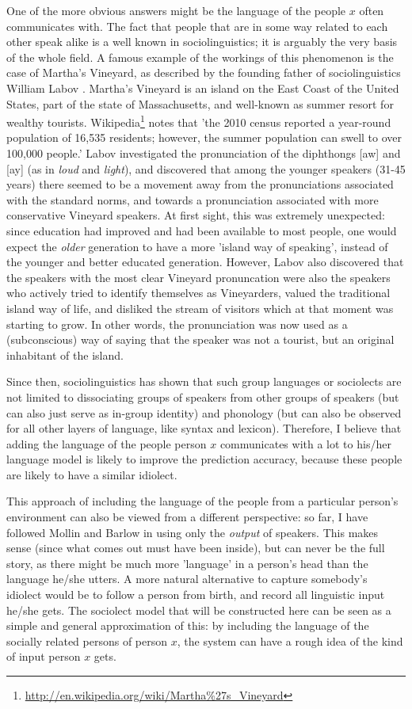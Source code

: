 \documentclass[11pt]{article}
\begin{document}
One of the more obvious answers might be the language of the people $x$ often communicates with. The fact that people that are in some way related to each other speak alike is a well known in sociolinguistics; it is arguably the very basis of the whole field. A famous example of the workings of this phenomenon is the case of Martha's Vineyard, as described by the founding father of sociolinguistics William Labov \cite{labov63}. Martha's Vineyard is an island on the East Coast of the United States, part of the state of Massachusetts, and well-known as summer resort for wealthy tourists. Wikipedia\footnote{\url{http://en.wikipedia.org/wiki/Martha\%27s\_Vineyard}} notes that 'the 2010 census reported a year-round population of 16,535 residents; however, the summer population can swell to over 100,000 people.' Labov investigated the pronunciation of the diphthongs [aw] and [ay] (as in \emph{loud} and \emph{light}), and discovered that among the younger speakers (31-45 years) there seemed to be a movement away from the pronunciations associated with the standard norms, and towards a pronunciation associated with more conservative  Vineyard speakers. At first sight, this was extremely unexpected: since education had improved and had been available to most people, one would expect the \emph{older} generation to have a more 'island way of speaking', instead of the younger and better educated generation. However, Labov also discovered that the speakers with the most clear Vineyard pronuncation were also the speakers who actively tried to identify themselves as Vineyarders, valued the traditional island way of life, and disliked the stream of visitors which at that moment was starting to grow. In other words, the pronunciation was now used as a (subconscious) way of saying that the speaker was not a tourist, but an original inhabitant of the island.

Since then, sociolinguistics has shown that such group languages or sociolects are not limited to dissociating groups of speakers from other groups of speakers (but can also just serve as in-group identity) and phonology (but can also be observed for all other layers of language, like syntax and lexicon). Therefore, I believe that adding the language of the people person $x$ communicates with a lot to his/her language model is likely to improve the prediction accuracy, because these people are likely to have a similar idiolect.

This approach of including the language of the people from a particular person's environment can also be viewed from a different perspective: so far, I have followed Mollin  and Barlow in using only the \emph{output} of speakers. This makes sense (since what comes out must have been inside), but can never be the full story, as there might be much more 'language' in a person's head than the language he/she utters. A more natural alternative to capture somebody's idiolect would be to follow a person from birth, and record all linguistic input he/she gets. The sociolect model that will be constructed here can be seen as a simple and general approximation of this: by including the language of the socially related persons of person $x$, the system can have a rough idea of the kind of input person $x$ gets.
\end{document}
